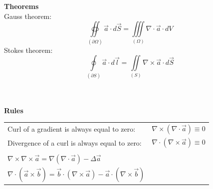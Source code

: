 \textbf{\\ \\ Theorems\\}
	Gauss theorem:
	\begin{equation*}
		\oiint\limits_{\left(\partial \Omega\right)} \vec{a} \cdot d\vec{S} = \iiint\limits_{\left(\Omega\right)} \nabla \cdot \vec{a} \cdot dV
	\end{equation*}
	Stokes theorem:
	\begin{equation*}
		\oint\limits_{\left(\partial S\right)} \vec{a} \cdot d\vec{l} = \iint\limits_{\left(S\right)} \nabla \times \vec{a} \cdot d\vec{S}
	\end{equation*}
	
\textbf{\\ \\ Rules \\}
\begin{tabular}{ll}
	Curl of a gradient is always equal to zero: & \(\displaystyle \nabla \times \left(\nabla \cdot \vec{a} \right) \equiv 0\) \\
	Divergence of a curl is always equal to zero: & \(\displaystyle \nabla \cdot \left(\nabla \times \vec{a}\right) \equiv 0 \)\\ \\
	\(\displaystyle \nabla \times \nabla \times \vec{a} = \nabla \left(\nabla \cdot \vec{a}\right) - \Delta \vec{a}\) \\
	\(\displaystyle \nabla \cdot \left(\vec{a} \times \vec{b}\right) = \vec{b} \cdot \left(\nabla \times \vec{a}\right) - \vec{a} \cdot \left(\nabla \times \vec{b}\right)\) 
\end{tabular}

